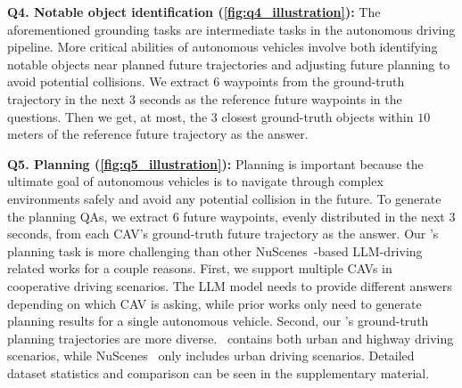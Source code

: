 \noindent\textbf{Q4. Notable object identification (\cref{fig:q4_illustration}):}
The aforementioned grounding tasks are intermediate tasks in the autonomous driving pipeline. More critical abilities of autonomous vehicles involve both identifying notable objects near planned future trajectories and adjusting future planning to avoid potential collisions. 
We extract $6$ waypoints from the ground-truth trajectory in the next $3$ seconds as the reference future waypoints in the questions. Then we get, at most, the $3$ closest ground-truth objects within $10$ meters of the reference future trajectory as the answer.


\noindent\textbf{Q5. Planning (\cref{fig:q5_illustration}):}
Planning is important because the ultimate goal of autonomous vehicles is to navigate through complex environments safely and avoid any potential collision in the future. 
To generate the planning QAs, we extract $6$ future waypoints, evenly distributed in the next $3$ seconds, from each CAV's ground-truth future trajectory as the answer. 
Our \namedataset's planning task is more challenging than other NuScenes~\cite{caesar2019nuscenes}-based LLM-driving related works for a couple reasons. First, we support multiple CAVs in cooperative driving scenarios. The LLM model needs to provide different answers depending on which CAV is asking, while prior works only need to generate planning results for a single autonomous vehicle. Second, our \namedataset's ground-truth planning trajectories are more diverse. \namedataset~contains both urban and highway driving scenarios, while NuScenes~\cite{caesar2019nuscenes} only includes urban driving scenarios. Detailed dataset statistics and comparison can be seen in the supplementary material.




